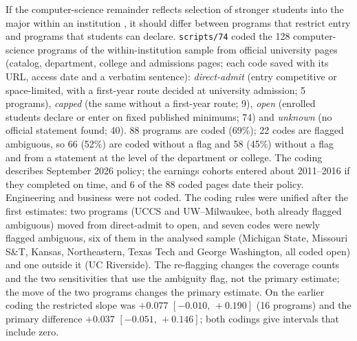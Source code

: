 \documentclass[11pt]{article}
\newcommand{\ci}[2]{$[#1,\allowbreak\,#2]$}
\newcommand{\scr}[1]{\texttt{scripts/#1}}
\begin{document}
If the computer-science remainder reflects selection of stronger students into the major within an institution
\citep{bleemer2022will}, it should differ between programs that restrict entry and programs that students can
declare. \scr{74} coded the 128 computer-science programs of the within-institution sample from official university
pages (catalog, department, college and admissions pages; each code saved with its URL, access date and a verbatim
sentence): \emph{direct-admit} (entry competitive or space-limited, with a first-year route decided at university
admission; 5 programs), \emph{capped} (the same without a first-year route; 9), \emph{open} (enrolled students declare
or enter on fixed published minimums; 74) and \emph{unknown} (no official statement found; 40). 88 programs are
coded (69\%); 22 codes are flagged ambiguous, so 66 (52\%) are coded without a flag and 58 (45\%) without a flag and
from a statement at the level of the department or college. The coding describes September 2026 policy; the
earnings cohorts entered about 2011--2016 if they completed on time, and 6 of the 88 coded pages date their policy.
Engineering and business were not coded. The coding rules were unified after the first estimates: two programs
(UCCS and UW--Milwaukee, both already flagged ambiguous) moved from direct-admit to open, and seven codes were newly
flagged ambiguous, six of them in the analysed sample (Michigan State, Missouri S\&T, Kansas, Northeastern, Texas
Tech and George Washington, all coded open) and one outside it (UC Riverside). The re-flagging changes the coverage
counts and the two sensitivities that use the ambiguity flag, not the primary estimate; the move of the two
programs changes the primary estimate. On the earlier coding the restricted slope was $+0.077$
\ci{-0.010}{+0.190} (16 programs) and the primary difference $+0.037$ \ci{-0.051}{+0.146}; both codings give
intervals that include zero.
\end{document}
